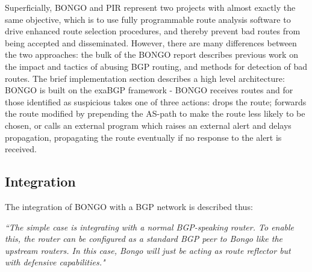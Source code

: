 \smallskip
Superficially, BONGO and PIR represent two projects with almost exactly the same objective, which is to use fully programmable route analysis software to drive enhanced route selection procedures, and thereby prevent bad routes from being accepted and disseminated.
However, there are many differences between the two approaches: the bulk of the BONGO report describes previous work on the impact and tactics of abusing BGP routing, and methods for detection of bad routes.
The brief implementation section describes a high level architecture: BONGO is built on the exaBGP framework - BONGO receives routes and for those identified as suspicious takes one of three actions: drops the route; forwards the route modified by prepending the AS-path to make the route less likely to be chosen, or calls an external program which raises an external alert and delays propagation, propagating the route eventually if no response to the alert is received.


\subsection{Integration}

The integration of BONGO with a BGP network is described thus:


\emph{``The simple case is integrating with a normal BGP-speaking router.
	To enable this, the router can be configured as a standard BGP peer to Bongo like the upstream routers.
	In this case, Bongo will just be acting as route reflector but with defensive capabilities."}



